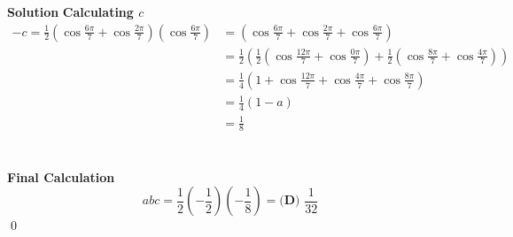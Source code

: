 \documentclass{article}
\newenvironment{solution}{\begin{trivlist}\item[]{\bf Solution}}{\qed \end{trivlist}}
\begin{document}
\begin{solution}
\textbf{Calculating $c$} \\
\begin{align*}
    -c=\frac{1}{2}\left(\cos\frac{6\pi}{7}+\cos\frac{2\pi}{7}\right)\left(\cos\frac{6\pi}{7}\right)&=\left(\cos\frac{6\pi}{7}+\cos\frac{2\pi}{7}+\cos\frac{6\pi}{7}\right) \\
    &=\frac{1}{2}\left(\frac{1}{2}\left(\cos\frac{12\pi}{7}+\cos\frac{0\pi}{7}\right)+\frac{1}{2}\left(\cos\frac{8\pi}{7}+\cos\frac{4\pi}{7}\right)\right) \\
    &=\frac{1}{4}\left(1+\cos\frac{12\pi}{7}+\cos\frac{4\pi}{7}+\cos\frac{8\pi}{7}\right) \\
    &=\frac{1}{4}(1-a) \\
    &=\frac{1}{8}
\end{align*}
\\\\
\textbf{Final Calculation}
\[
abc=\frac{1}{2}\left(-\frac{1}{2}\right)\left(-\frac{1}{8}\right)=\boxed{\textbf{(D) }\frac{1}{32}}
\]
\end{solution}
\end{document}
